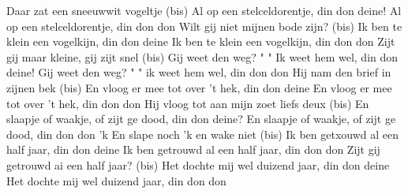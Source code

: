 \beginverse*
Daar zat een sneeuwwit vogeltje (bis)
Al op een stelceldorentje, din don deine!
Al op een stelceldorentje, din don don
\endverse
\beginverse*
Wilt gij niet mijnen bode zijn? (bis)
Ik ben te klein een vogelkijn, din don deine 
Ik ben te klein een vogelkijn, din don don
\endverse
\beginverse*
Zijt gij maar kleine, gij zijt snel (bis)
Gij weet den weg? " " Ik weet hem wel, din don deine!
Gij weet den weg? " " ik weet hem wel, din don don
\endverse
\beginverse*
Hij nam den brief in zijnen bek (bis)
En vloog er mee tot over 't hek, din don deine
En vloog er mee tot over 't hek, din don don
\endverse
\beginverse*
Hij vloog tot aan mijn zoet liefs deux (bis)
En slaapje of waakje, of zijt ge dood, din don deine? 
En slaapje of waakje, of zijt ge dood, din don don
\endverse
\beginverse*
'k En slape noch 'k en wake niet (bis)
Ik ben getxouwd al een half jaar, din don deine
Ik ben getrouwd al een half jaar, din don don
\endverse
\beginverse*
Zijt gij getrouwd ai een half jaar? (bis)
Het dochte mij wel duizend jaar, din don deine 
Het dochte mij wel duizend jaar, din don don
\endverse
\endsong